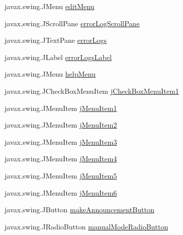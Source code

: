 \begin{DoxyCompactItemize}
javax.\+swing.\+J\+Menu \hyperlink{classTrainControllerComps_1_1TrainController_ab6cca8dbc7f603fa3c6b03e0aa214134}{edit\+Menu}
\item 
javax.\+swing.\+J\+Scroll\+Pane \hyperlink{classTrainControllerComps_1_1TrainController_a46210ac977c8b30bb8b58c3eedab9024}{error\+Log\+Scroll\+Pane}
\item 
javax.\+swing.\+J\+Text\+Pane \hyperlink{classTrainControllerComps_1_1TrainController_aa3697c9e16c0ef456c46177a4e98d0b8}{error\+Logs}
\item 
javax.\+swing.\+J\+Label \hyperlink{classTrainControllerComps_1_1TrainController_a122803c2eee806971fd54d0cfcc3dba7}{error\+Logs\+Label}
\item 
javax.\+swing.\+J\+Menu \hyperlink{classTrainControllerComps_1_1TrainController_ad3cdb9def09e8d3c58b29669a6c22c48}{help\+Menu}
\item 
javax.\+swing.\+J\+Check\+Box\+Menu\+Item \hyperlink{classTrainControllerComps_1_1TrainController_a92b8d2e249e28491332c93e3b50ba96d}{j\+Check\+Box\+Menu\+Item1}
\item 
javax.\+swing.\+J\+Menu\+Item \hyperlink{classTrainControllerComps_1_1TrainController_a870d25e5ddebf944305cd14cf793ef16}{j\+Menu\+Item1}
\item 
javax.\+swing.\+J\+Menu\+Item \hyperlink{classTrainControllerComps_1_1TrainController_a81595f9f2e98d47672a76667d9a38a61}{j\+Menu\+Item2}
\item 
javax.\+swing.\+J\+Menu\+Item \hyperlink{classTrainControllerComps_1_1TrainController_af7f9bf0cf65e5a00f0013d03e477587b}{j\+Menu\+Item3}
\item 
javax.\+swing.\+J\+Menu\+Item \hyperlink{classTrainControllerComps_1_1TrainController_ab15e90c9e1ea781de06e3c472f9ef332}{j\+Menu\+Item4}
\item 
javax.\+swing.\+J\+Menu\+Item \hyperlink{classTrainControllerComps_1_1TrainController_af2ef143e8969ce9a5197ddf6cc538b0f}{j\+Menu\+Item5}
\item 
javax.\+swing.\+J\+Menu\+Item \hyperlink{classTrainControllerComps_1_1TrainController_a9b96101c9d16dbc6c7ca72a62c3b58fe}{j\+Menu\+Item6}
\item 
javax.\+swing.\+J\+Button \hyperlink{classTrainControllerComps_1_1TrainController_a6986785808de7b43b332992eed9b1c3f}{make\+Announcement\+Button}
\item 
javax.\+swing.\+J\+Radio\+Button \hyperlink{classTrainControllerComps_1_1TrainController_a5e84730a70f6997f9bb3ea171b254809}{manual\+Mode\+Radio\+Button}
\item 

\end{DoxyCompactItemize}
